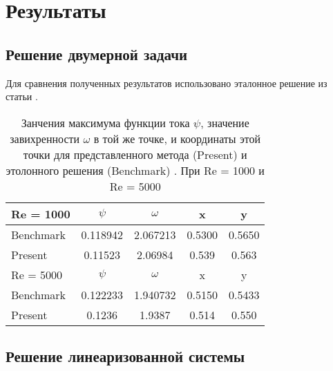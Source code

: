 \section*{Результаты}
\subsection*{Решение двумерной задачи}

Для сравнения полученных результатов использовано эталонное решение из статьи \cite{2DBench}. 

\begin{table}
\center
  \begin{tabular}{lcccc}
\hline
	Re = 1000 
		& $\psi$   	& $\omega$ 	& x 		& y \\
\hline	
	Benchmark 	& 0.118942 	& 2.067213 	& 0.5300   	& 0.5650 \\
	Present		& 0.11523	& 2.06984	& 0.539		& 0.563 \\
\hline 
\hline
	Re = 5000 
		& $\psi$   	& $\omega$ 	& x 		& y \\
\hline	
	Benchmark 	& 0.122233 	& 1.940732 	& 0.5150   	& 0.5433 \\
	Present		& 0.1236	& 1.9387	& 0.514		& 0.550 \\
\hline 
  \end{tabular}
\caption{Занчения максимума функции тока $\psi$, значение завихренности $\omega$ в той же точке, и координаты этой точки для представленного 
метода (Present) и этолонного решения (Benchmark) \cite{2DBench}. При Re = 1000 и Re = 5000}
\label{comp}
\end{table}



\subsection*{Решение линеаризованной системы} 

